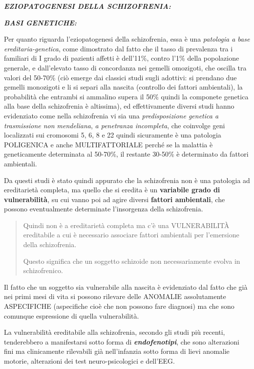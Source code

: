 \documentclass[]{article}
\begin{document}
\textbf{\emph{EZIOPATOGENESI DELLA SCHIZOFRENIA:}}

\textbf{\emph{BASI GENETICHE:}}

Per quanto riguarda l'eziopatogenesi della schizofrenia, essa è una
\emph{patologia a base ereditaria-genetica}, come dimostrato dal fatto
che il tasso di prevalenza tra i familiari di I grado di pazienti
affetti è dell'11\%, contro l'1\% della popolazione generale, e
dall'elevato tasso di concordanza nei gemelli omozigoti, che oscilla tra
valori del 50-70\% (ciò emerge dai classici studi sugli adottivi: si
prendano due gemelli monozigoti e li si separi alla nascita (controllo
dei fattori ambientali), la probabilità che entrambi si ammalino supera
il 50\% quindi la componete genetica alla base della schizofrenia è
altissima), ed effettivamente diversi studi hanno evidenziato come nella
schizofrenia vi sia una \emph{predisposizione genetica a trasmissione
non mendeliana}, \emph{a penetranza incompleta}, che coinvolge geni
localizzati sui cromosomi 5, 6, 8 e 22 quindi sicuramente è una
patologia POLIGENICA e anche MULTIFATTORIALE perché se la malattia è
geneticamente determinata al 50-70\%, il restante 30-50\% è determinato
da fattori ambientali.

Da questi studi è stato quindi appurato che la schizofrenia non è una
patologia ad ereditarietà completa, ma quello che si eredita è un
\textbf{variabile grado di vulnerabilità}, su cui vanno poi ad agire
diversi \textbf{fattori ambientali}, che possono eventualmente
determinate l'insorgenza della schizofrenia.

\begin{quote}
Quindi non è a ereditarietà completa ma c'è una VULNERABILITÀ
ereditabile a cui è necessario associare fattori ambientali per
l'emersione della schizofrenia.

Questo significa che un soggetto schizoide non necessariamente evolva in
schizofrenico.
\end{quote}

Il fatto che un soggetto sia vulnerabile alla nascita è evidenziato dal
fatto che già nei primi mesi di vita si possono rilevare delle ANOMALIE
assolutamente ASPECIFICHE (aspecifiche cioè che non possono fare
diagnosi) ma che sono comunque espressione di quella vulnerabilità.

La vulnerabilità ereditabile alla schizofrenia, secondo gli studi più
recenti, tenderebbero a manifestarsi sotto forma di
\textbf{\emph{endofenotipi}}, che sono alterazioni fini ma clinicamente
rilevabili già nell'infanzia sotto forma di lievi anomalie motorie,
alterazioni dei test neuro-psicologici e dell'EEG.
\end{document}
